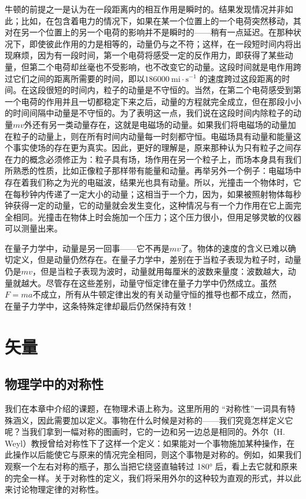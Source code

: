 \documentclass[12pt,oneside]{book}
\begin{document}
牛顿的前提之一是认为在一段距离内的相互作用是瞬时的。结果发现情况并非如此；比如，在包含着电力的情况下，如果在某一个位置上的一个电荷突然移动，其对在另一个位置上的另一个电荷的影响并不是瞬时的——稍有一点延迟。在那种状况下，即使彼此作用的力是相等的，动量仍与之不符；这样，在一段短时间内将出现麻烦，因为有一段时间，第一个电荷将感受一定的反作用力，即获得了某些动量，但第二个电荷却丝毫也不受影响，也不改变它的动量。这段时间就是电作用跨过它们之间的距离所需要的时间，即以$ 186000\ \mathrm{mi\cdot s^{-1}} $ 的速度跨过这段距离的时间。在这段很短的时间内，粒子的动量是不守恒的。当然，在第二个电荷感受到第一个电荷的作用并且一切都稳定下来之后，动量的方程就完全成立，但在那段小小的时间间隔中动量是不守恒的。为了表明这一点，我们说在这段时间内除粒子的动量$ mv $外还有另一类动量存在，这就是电磁场的动量。如果我们将电磁场的动量加在粒子的动量上，则在所有时间内动量每一时刻都守恒。电磁场具有动量和能量这个事实使场的存在更为真实。因此，更好的理解是，原来那种认为只有粒子之间存在力的概念必须修正为：粒子具有场，场作用在另一个粒子上，而场本身具有我们所熟悉的性质，比如正像粒子那样带有能量和动量。再举另外一个例子：电磁场中存在着我们称之为光的电磁波，结果光也具有动量。所以，光撞击一个物体时，它在每秒钟内传递了一定大小的动量；这相当于一个力，因为，如果被照射物体每秒钟获得一定的动量，它的动量就会发生变化，这种情况与有一个力作用在它上面完全相同。光撞击在物体上时会施加一个压力；这个压力很小，但用足够灵敏的仪器可以测量出来。

在量子力学中，动量是另一回事——它不再是$ mv $了。物体的速度的含义已难以确切定义，但是动量仍然存在。在量子力学中，差别在于当粒子表现为粒子时，动量仍是$ mv $，但是当粒子表现为波时，动量就用每厘米的波数来量度：波数越大，动量就越大。尽管存在这些差别，动量守恒定律在量子力学中仍然成立。虽然$ F=ma $不成立，所有从牛顿定律出发的有关动量守恒的推导也都不成立，然而，在量子力学中，这条特殊定律却最后仍然保持有效！


\chapter{矢量}
\section{物理学中的对称性}
我们在本章中介绍的课题，在物理术语上称为。这里所用的 “对称性”一词具有特殊涵义，因此需要加以定义。事物在什么时候是对称的——我们究竟怎样定义它呢？当我们拿到一幅对称的图画时，它的一边和另一边总是相同的。外尔（H. Weyl）教授曾给对称性下了这样一个定义：如果能对一个事物施加某种操作，在此操作以后能使它与原来的情况完全相同，则这个事物是对称的。例如，如果我们观察一个左右对称的瓶子，那么当把它绕竖直轴转过 180° 后，看上去它就和原来的完全一样。关于对称性的定义，我们将采用外尔的这种较为直观的形式，并以此来讨论物理定律的对称性。
\end{document}
